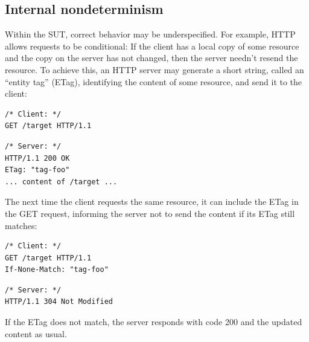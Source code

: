\subsection{Internal nondeterminism}
\label{sec:internal-nondeterminism}
Within the SUT, correct behavior may be \mbox{underspecified}.  For example,
HTTP~\cite{rfc7232} allows requests to be conditional: If the client has a local
copy of some resource and the copy on the server has not changed, then the
server needn't resend the resource.  To achieve this, an HTTP server may
generate a short string, called an ``entity tag'' (ETag), identifying the
content of some resource, and send it to the client:
\begin{center}
  \begin{minipage}[t]{.4\textwidth}
    \begin{lstlisting}[style=customc]
/* Client: */
GET /target HTTP/1.1
    \end{lstlisting}
  \end{minipage}\begin{minipage}[t]{.4\textwidth}
    \begin{lstlisting}[style=customc]
/* Server: */
HTTP/1.1 200 OK
ETag: "tag-foo"
... content of /target ...
    \end{lstlisting}
  \end{minipage}
\end{center}
The next time the client requests the same resource, it can include the ETag in
the GET request, informing the server not to send the content if its ETag still
matches:
\begin{center}
\begin{minipage}[t]{.4\textwidth}
\begin{lstlisting}[style=customc]
/* Client: */
GET /target HTTP/1.1
If-None-Match: "tag-foo"
\end{lstlisting}
\end{minipage}\begin{minipage}[t]{.4\textwidth}
\begin{lstlisting}[style=customc]
/* Server: */
HTTP/1.1 304 Not Modified
\end{lstlisting}
\end{minipage}
\end{center}
If the ETag does not match, the server responds with code 200 and the updated
content as usual.

